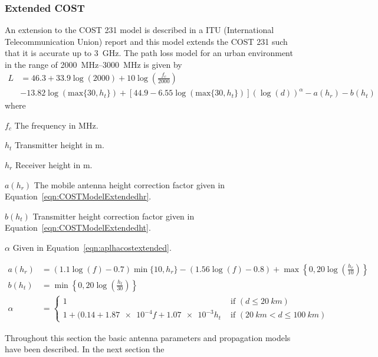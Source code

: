 \subsubsection{Extended COST}
An extension to the COST 231 model is described in a ITU (International Telecommunication Union) report \cite{itu2002report} and this model extends the COST 231 such that it is accurate up to \SI{3}{GHz}. The path loss model for an urban environment in the range of \SIrange{2000}{3000}{MHz} is given by \cite{itu2002report}
\begin{equation}%
\label{eqn:COSTModelExtended}
\begin{aligned}
    L &= 46.3 + 33.9 \log(2000) + 10 \log\left(\frac{f_c}{2000}\right) \\
        &- 13.82 \log(\text{max}\{30,h_t\}) + [44.9 -6.55 \log(\text{max}\{30,h_t\})] (\log(d))^{\alpha} - a(h_r) - b(h_t)
\end{aligned}
\end{equation} 
where
\begin{where}
\item [$f_c$] The frequency in \si{MHz}.
\item [$h_t$] Transmitter height in \si{m}. 
\item [$h_r$] Receiver height in \si{m}.
\item [$a(h_r)$] The mobile antenna height correction factor given in Equation~\ref{eqn:COSTModelExtendedhr}.
\item [$b(h_t)$] Transmitter height correction factor given in Equation~\ref{eqn:COSTModelExtendedht}.
\item [$\alpha$] Given in Equation~\ref{eqn:aplhacostextended}.
\end{where}
\begin{align} %
\label{eqn:COSTModelExtendedhr}
a(h_r)&=(1.1\log(f)-0.7) \min\{10,h_r\}-(1.56\log(f)-0.8)+\max\left\{0,20\log\left(\frac{h_r}{10}\right)\right\}\\
\label{eqn:COSTModelExtendedht}
b(h_t)&= \min\left\{0,20\log\left(\frac{h_t}{30}\right)\right\}\\
\label{eqn:aplhacostextended}
\alpha &= 
  \begin{cases}
      1 & \text{ if } (d \leq \SI{20}{km}) \\
    1+(0.14+\num{1.87e-4} f + \num{1.07e-3} h_t & \text{ if } (\SI{20}{km} < d \leq \SI{100}{km})
  \end{cases}
\end{align} 

\begin{aautail}
Throughout this section the basic antenna parameters and propagation models have been described. In the next section the  
\end{aautail}
